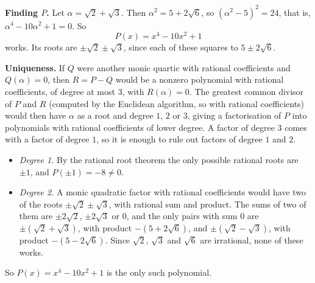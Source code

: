 \textbf{Finding $P$.} Let $\alpha=\sqrt2+\sqrt3$. Then $\alpha^2=5+2\sqrt6$, so $\left(\alpha^2-5\right)^2=24$, that is, $\alpha^4-10\alpha^2+1=0$. So
\[P(x)=\boxed{x^4-10x^2+1}\]
works. Its roots are $\pm\sqrt2\pm\sqrt3$, since each of these squares to $5\pm2\sqrt6$.

\textbf{Uniqueness.} If $Q$ were another monic quartic with rational coefficients and $Q(\alpha)=0$, then $R=P-Q$ would be a nonzero polynomial with rational coefficients, of degree at most $3$, with $R(\alpha)=0$. The greatest common divisor of $P$ and $R$ (computed by the Euclidean algorithm, so with rational coefficients) would then have $\alpha$ as a root and degree $1$, $2$ or $3$, giving a factorisation of $P$ into polynomials with rational coefficients of lower degree. A factor of degree $3$ comes with a factor of degree $1$, so it is enough to rule out factors of degree $1$ and $2$.
\begin{itemize}
\item \emph{Degree 1.} By the rational root theorem the only possible rational roots are $\pm1$, and $P(\pm1)=-8\ne0$.
\item \emph{Degree 2.} A monic quadratic factor with rational coefficients would have two of the roots $\pm\sqrt2\pm\sqrt3$, with rational sum and product. The sums of two of them are $\pm2\sqrt2$, $\pm2\sqrt3$ or $0$, and the only pairs with sum $0$ are $\pm\left(\sqrt2+\sqrt3\right)$, with product $-\left(5+2\sqrt6\right)$, and $\pm\left(\sqrt2-\sqrt3\right)$, with product $-\left(5-2\sqrt6\right)$. Since $\sqrt2$, $\sqrt3$ and $\sqrt6$ are irrational, none of these works.
\end{itemize}
So $P(x)=x^4-10x^2+1$ is the only such polynomial.
